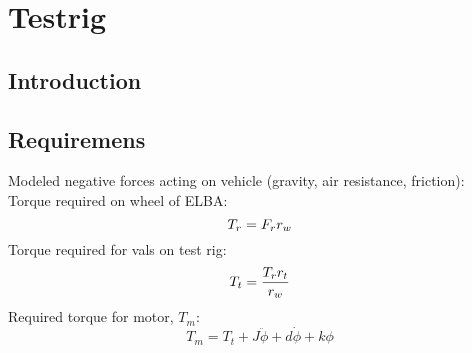 \chapter{Testrig}
\section{Introduction}

\section{Requiremens}
Modeled negative forces acting on vehicle (gravity, air resistance, friction): 
Torque required on wheel of ELBA:$$T_r = F_r\*r_w$$
Torque required for vals on test rig: $$T_t = \frac{T_r\*r_t}{r_w}$$
Required torque for motor, $T_m$:
$$T_m = T_t + J\ddot{\phi} + d\dot{\phi} + k\phi$$

